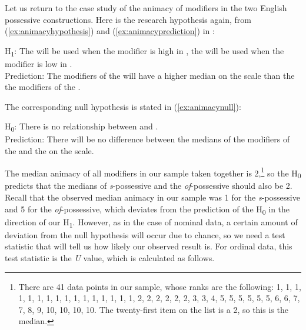 Let us return to the case study of the animacy  of modifiers in the two English possessive  constructions. Here is the research hypothesis again, from (\ref{ex:animacyhypothesis}) and (\ref{ex:animacyprediction}) in :

\begin{exe}
\ex H\textsubscript{1}: The  will be used when the modifier is high in ,  the  will be used when the modifier is low in . \\[1.5ex]
Prediction: The modifiers of the   will have a higher median  on the  scale than the the modifiers of the .
\label{ex:animacyalternative}
\end{exe}

The corresponding null hypothesis  is stated in  (\ref{ex:animacynull}):

\begin{exe}
\ex H\textsubscript{0}: There is no relationship between  and .  \\[1.5ex]
Prediction: There will be no difference between the medians  of the modifiers of the  and the  on the  scale.
\label{ex:animacynull}
\end{exe}

The median  animacy  of all modifiers in our sample taken together is 2,\footnote{There are 41 data points in our sample, whose ranks are the following: 1, 1, 1, 1, 1, 1, 1, 1, 1, 1, 1, 1, 1, 1, 1, 1, 2, 2, 2, 2, 2, 2, 3, 3, 4, 5, 5, 5, 5, 5, 5, 6, 6, 7, 7, 8, 9, 10, 10, 10, 10. The twenty\hyp{}first item on the list is a 2, so this is the median.} so the H\textsubscript{0} predicts that the medians  of \textit{s}-possessive  and the \textit{of}-possessive should also be 2. Recall that the observed median animacy in our sample was 1 for the \textit{s}-possessive and 5 for the \textit{of}-possessive, which deviates from the prediction of the H\textsubscript{0} in the direction of our H\textsubscript{1}. However, as in the case of nominal  data, a certain amount of deviation from the null hypothesis  will occur due to chance,  so we need a test statistic that will tell us how likely our observed result is. For ordinal  data, this test statistic is the \textit{U} value, which is calculated as follows.

